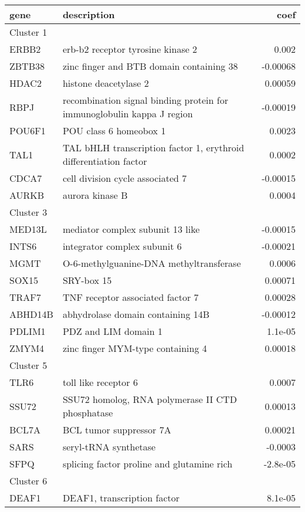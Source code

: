 \documentclass{article}
\begin{document}
\begin{table*}[ht!]
\centering
\begin{tabular}{llr}
  \toprule
gene & description & coef \\ 
  \midrule
  Cluster 1 \\
  \midrule
ERBB2 & erb-b2 receptor tyrosine kinase 2 & 0.002 \\ 
  ZBTB38 & zinc finger and BTB domain containing 38 & -0.00068 \\ 
  HDAC2 & histone deacetylase 2 & 0.00059 \\ 
  RBPJ & recombination signal binding protein for immunoglobulin kappa J region & -0.00019 \\ 
  POU6F1 & POU class 6 homeobox 1 & 0.0023 \\ 
  TAL1 & TAL bHLH transcription factor 1, erythroid differentiation factor & 0.0002 \\ 
  CDCA7 & cell division cycle associated 7 & -0.00015 \\ 
  AURKB & aurora kinase B & 0.0004 \\ 
   \midrule
   Cluster 3 \\
   \midrule
   MED13L & mediator complex subunit 13 like & -0.00015 \\ 
  INTS6 & integrator complex subunit 6 & -0.00021 \\ 
  MGMT & O-6-methylguanine-DNA methyltransferase & 0.0006 \\ 
  SOX15 & SRY-box 15 & 0.00071 \\ 
  TRAF7 & TNF receptor associated factor 7 & 0.00028 \\ 
  ABHD14B & abhydrolase domain containing 14B & -0.00012 \\ 
  PDLIM1 & PDZ and LIM domain 1 & 1.1e-05 \\ 
  ZMYM4 & zinc finger MYM-type containing 4 & 0.00018 \\ 
   \midrule
   Cluster 5 \\
   \midrule
   TLR6 & toll like receptor 6 & 0.0007 \\ 
  SSU72 & SSU72 homolog, RNA polymerase II CTD phosphatase & 0.00013 \\ 
  BCL7A & BCL tumor suppressor 7A & 0.00021 \\ 
  SARS & seryl-tRNA synthetase & -0.0003 \\ 
  SFPQ & splicing factor proline and glutamine rich & -2.8e-05 \\ 
  \midrule
  Cluster 6 \\
  \midrule
  DEAF1 & DEAF1, transcription factor & 8.1e-05 \\ 

\end{tabular}
\end{table*}
\end{document}
